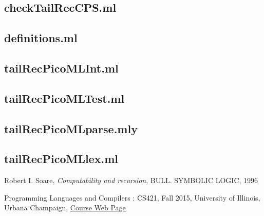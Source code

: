 \documentclass{article}
\begin{document}
\subsection{checkTailRecCPS.ml}



\newpage

\subsection{definitions.ml}



\newpage

\subsection{tailRecPicoMLInt.ml}



\newpage

\subsection{tailRecPicoMLTest.ml}



\newpage

\subsection{tailRecPicoMLparse.mly}



\newpage

\subsection{tailRecPicoMLlex.ml}



\begin{thebibliography}{9}
  
    Robert I. Soare,
    \emph{Computability and recursion},
    BULL. SYMBOLIC LOGIC,
    1996

  Programming Languages and Compilers : CS421,
  Fall 2015,
  University of Illinois, Urbana Champaign,
\href{https://courses.engr.illinois.edu/cs421/mps/index.html}{Course Web Page}
\end{thebibliography}
\end{document}
